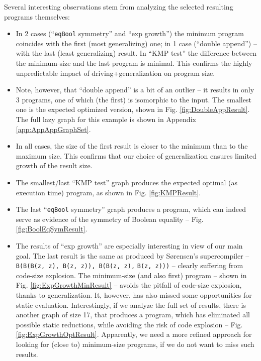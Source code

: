 \documentclass[submission,copyright,creativecommons]{eptcs}
\begin{document}
Several interesting observations stem from analyzing the selected resulting programs themselves:
\begin{itemize}
  \item In 2 cases (``\verb|eqBool| symmetry'' and ``exp growth'') the minimum program coincides with the first (most generalizing) one;
    in 1 case (``double append'') -- with the last (least generalizing) result. 
    In ``KMP test'' the difference between the minimum-size and the last program is minimal.
    This confirms the highly unpredictable impact of driving+generalization on program size.
  \item Note, however, that ``double append'' is a bit of an outlier -- it results in only 3 programs,
    one of which (the first) is isomorphic to the input. The smallest one is the expected
    optimized version, shown in Fig. \ref{fig:DoubleAppResult}.
\ifVptVer
\else    
    The full lazy graph for this example is shown in Appendix \ref{app:AppAppGraphSet}.
\fi    
  \item In all cases, the size of the first result is closer to the minimum than to the maximum size.
    This confirms that our choice of generalization ensures limited growth of the result size.
  \item The smallest/last ``KMP test'' graph produces the expected optimal (as execution time) program,
    as shown in Fig. \ref{fig:KMPResult}.
  \item The last ``\verb|eqBool| symmetry'' graph produces a program, which can indeed serve as evidence of the
    symmetry of Boolean equality -- Fig. \ref{fig:BoolEqSymResult}.
  \item The results of ``exp growth'' are especially interesting in view of our main goal.
    The last result is the same as produced by S{\o}rensen's supercompiler --
    \verb|B(B(B(z, z), B(z, z)), B(B(z, z),| \verb|B(z, z)))| -- clearly suffering from code-size explosion.
    The minimum-size (and also first) program -- shown in Fig. \ref{fig:ExpGrowthMinResult} --
    avoids the pitfall of code-size explosion, thanks to generalization.
    It, however, has also missed some opportunities for static evaluation.
    Interestingly, if we analyze the full set of results, there is another
    graph of size 17, that produces a program, which has eliminated all possible static reductions,
    while avoiding the risk of code explosion -- Fig. \ref{fig:ExpGrowthOptResult}.
    Apparently, we need a more refined approach for looking for (close to) minimum-size programs, 
    if we do not want to miss such results.

\end{itemize}
\end{document}
